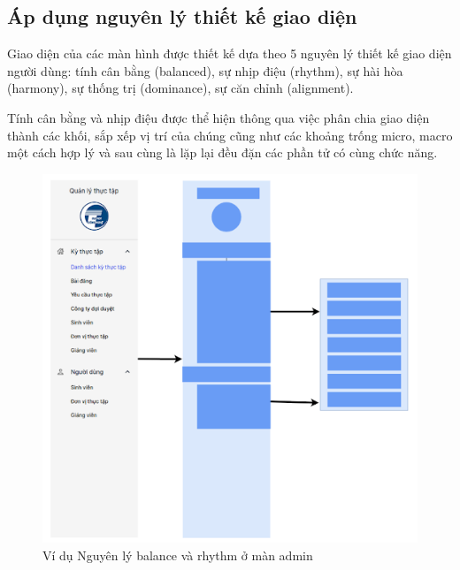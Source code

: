 \documentclass[./../main.tex]{subfiles}
\begin{document}
\subsection{Áp dụng nguyên lý thiết kế giao diện}

Giao diện của các màn hình được thiết kế dựa theo 5 nguyên lý thiết kế giao diện người dùng: tính cân bằng (balanced), sự nhịp điệu (rhythm), sự hài hòa (harmony), sự thống trị (dominance), sự căn chỉnh (alignment).

Tính cân bằng và nhịp điệu được thể hiện thông qua việc phân chia giao diện thành các khối, sắp xếp vị trí của chúng cũng như các khoảng trống micro, macro một cách hợp lý và sau cùng là lặp lại đều đặn các phần tử có cùng chức năng.

\begin{figure}[H]
	\includegraphics[width=\linewidth]{./images/image33.png}
	\caption{Ví dụ Nguyên lý balance và rhythm ở màn admin}
	\label{fig:example_rhythm_admin}
\end{figure}
\end{document}
